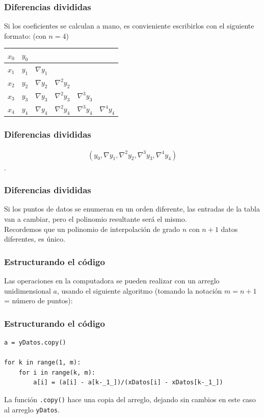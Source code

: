 \documentclass[12pt]{beamer}
\begin{document}
\begin{frame}
\frametitle{Diferencias divididas}
Si los coeficientes se calculan a mano, es convieniente escribirlos con el siguiente formato:
(con $n=4$)
\pause
\begin{table}
\centering
\small
\begin{tabular}{| c | c | c | c | c | c |}
\hline $x_{0}$ & $y_{0}$ & & & & \\
\hline $x_{1}$ & $y_{1}$ & $\nabla y_{1}$ & & & \\
\hline $x_{2}$ & $y_{2}$ & $\nabla y_{2}$ & $\nabla^{2} y_{2}$ & &  \\
\hline $x_{3}$ & $y_{3}$ & $\nabla y_{3}$ & $\nabla^{2} y_{3}$ & $\nabla^{3} y_{3}$ &  \\
\hline $x_{4}$ & $y_{4}$ & $\nabla y_{4}$ & $\nabla^{2} y_{4}$ & $\nabla^{3} y_{4}$ & $\nabla^{4} y_{4}$ \\
\hline
\end{tabular}
\end{table}
\end{frame}
\begin{frame}
\frametitle{Diferencias divididas}
\begin{align*}
(y_{0}, \nabla y_{1}, \nabla^{2} y_{2}, \nabla^{3} y_{3}, \nabla^{4} y_{4})
\end{align*}
\pause
{}.
\end{frame}
\begin{frame}
\frametitle{Diferencias divididas}
Si los puntos de datos se enumeran en un orden diferente, las entradas de la tabla van a cambiar, pero el polinomio resultante será el mismo.
\\
\bigskip
Recordemos que un polinomio de interpolación de grado $n$ con $n + 1$ datos diferentes, es único.
\end{frame}
\begin{frame}[fragile]
\frametitle{Estructurando el código}
Las operaciones en la computadora se pueden realizar con un arreglo unidimensional $a$, usando el siguiente algoritmo (tomando la notación $m = n + 1$ = número de puntos):
\end{frame}
\begin{frame}[fragile]
\frametitle{Estructurando el código}
\begin{lstlisting}[caption=Calculando los coeficientes del polinomio, style=FormattedNumber, basicstyle=\linespread{1.1}\ttfamily=\small, columns=fullflexible]
a = yDatos.copy()

for k in range(1, m):
    for i in range(k, m):
        a[i] = (a[i] - a[k-_1_])/(xDatos[i] - xDatos[k-_1_])
\end{lstlisting}
La función \texttt{.copy()} hace una copia del arreglo, dejando sin cambios en este caso al arreglo \texttt{yDatos}.
\end{frame}
\end{document}
